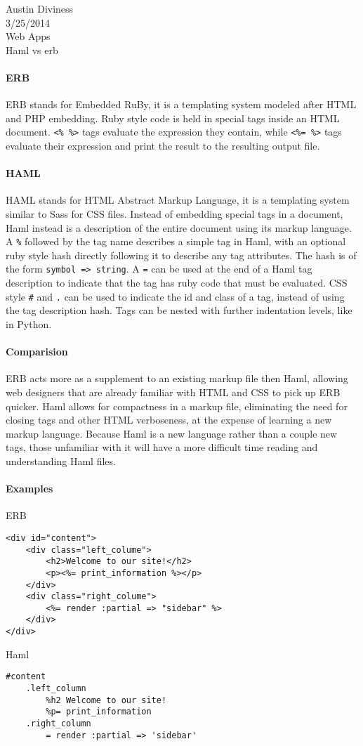 \documentclass{article}
\begin{document}
\noindent
Austin Diviness \\
3/25/2014 \\
Web Apps \\
Haml vs erb \\

\paragraph{ERB} 
ERB stands for Embedded RuBy, it is a templating system modeled after HTML and PHP embedding. Ruby style code is held in special tags inside an HTML document. \texttt{<\% \%>} tags evaluate the expression they contain, while \texttt{<\%= \%>} tags evaluate their expression and print the result to the resulting output file. 


\paragraph{HAML} 
HAML stands for HTML Abstract Markup Language, it is a templating system similar to Sass for CSS files. Instead of embedding special tags in a document, Haml instead is a description of the entire document using its markup language. A \texttt{\%} followed by the tag name describes a simple tag in Haml, with an optional ruby style hash directly following it to describe any tag attributes. The hash is of the form \texttt{symbol => string}. A \texttt{=} can be used at the end of a Haml tag description to indicate that the tag has ruby code that must be evaluated. CSS style \texttt{\#} and \texttt{.} can be used to indicate the id and class of a tag, instead of using the tag description hash. Tags can be nested with further indentation levels, like in Python.

\paragraph{Comparision} 
ERB acts more as a supplement to an existing markup file then Haml, allowing web designers that are already familiar with HTML and CSS to pick up ERB quicker. Haml allows for compactness in a markup file, eliminating the need for closing tags and other HTML verboseness, at the expense of learning a new markup language. Because Haml is a new language rather than a couple new tags, those unfamiliar with it will have a more difficult time reading and understanding Haml files.

\paragraph{Examples} 
ERB \\
\begin{verbatim}
<div id="content">
    <div class="left_colume">
        <h2>Welcome to our site!</h2>
        <p><%= print_information %></p>
    </div>
    <div class="right_colume">
        <%= render :partial => "sidebar" %>
    </div>
</div>
\end{verbatim}

Haml
\begin{verbatim}
#content
    .left_column
        %h2 Welcome to our site!
        %p= print_information
    .right_column
        = render :partial => 'sidebar'
\end{verbatim}
\end{document}
